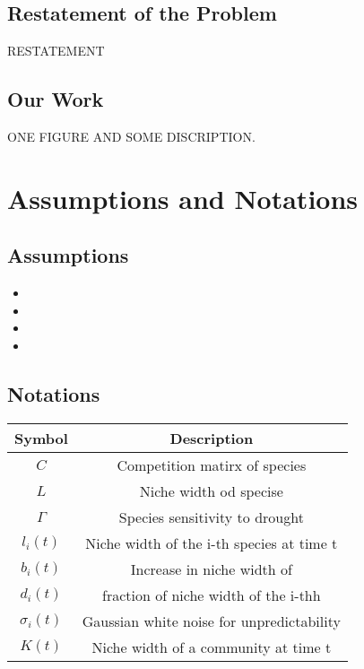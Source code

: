 \documentclass{mcmthesis}
\begin{document}
\subsection{Restatement of the Problem}
RESTATEMENT
\subsection{Our Work}
ONE FIGURE AND SOME DISCRIPTION.

\section{Assumptions and Notations}%
\subsection{Assumptions}
\begin{itemize}
	\item
	\item
	\item
	\item
\end{itemize}
\subsection{Notations}
	\begin{table}[h]%
		\centering%
		\renewcommand\arraystretch{1.5}%
		\tabcolsep=1.5cm%
		\begin{tabular}{@{}cclll@{}}
			\toprule[1.5pt]
			\textbf{Symbol}               & \multicolumn{4}{c}{\textbf{Description}}                      \\
			\midrule[1pt]
			$C$                           & \multicolumn{4}{c}{Competition matirx of species}             \\
			$L$                           & \multicolumn{4}{c}{Niche width od specise}                    \\
			$\Gamma $                     & \multicolumn{4}{c}{Species sensitivity to drought}            \\
			${l_i}\left( t \right)$       & \multicolumn{4}{c}{Niche width of the i-th species at time t} \\
			${b_i}\left( t \right)$       & \multicolumn{4}{c}{Increase in niche width of }               \\
			${d_i}\left( t \right)$       & \multicolumn{4}{c}{fraction of niche width of the i-thh}      \\
			${\sigma _i}\left( t \right)$ & \multicolumn{4}{c}{Gaussian white noise for unpredictability} \\
			$K\left( t \right)$           & \multicolumn{4}{c}{Niche width of a community at time t}      \\
			\bottomrule[1.5pt]
		\end{tabular}
	\end{table}
\end{document}
